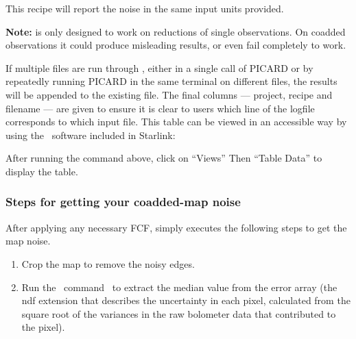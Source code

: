 \begin{terminalv}
\end{terminalv}
This recipe will report the noise in the same input units provided.


\textbf{Note:}  is only designed to work on
reductions of single observations. On coadded observations it could
produce misleading results, or even fail completely to work.

If multiple files are run through , either in a single call
of PICARD or by repeatedly running PICARD in the same terminal on different
files, the results will be appended to the existing  file.
The final columns — project, recipe and filename — are given to ensure it
is clear to users which line of the logfile corresponds to which input file.
This table can be viewed in an accessible way by using the \topcat\ software
included in Starlink:

\begin{terminalv}
\end{terminalv}

After running the command above, click on “Views” Then “Table Data” to display the table.

\subsubsection*{Steps for getting your coadded-map noise}
After applying any necessary FCF,  simply
executes the following steps to get the map noise.

\begin{enumerate}
\item Crop the map to remove the noisy edges.

\begin{terminalv}
\end{terminalv}

\item Run the \Kappa\ command \stats\ to extract the median value from
the error array (the ndf extension that describes the uncertainty in each pixel,
calculated from the square root of the variances in the raw bolometer data
that contributed to the pixel).

\begin{terminalv}
\end{terminalv}

\end{enumerate}

